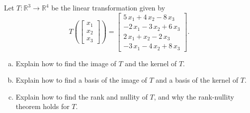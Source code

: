 
\begin{exerciseStatement}
 Let \(T:\mathbb{R}^ 3  \to \mathbb{R}^ 4 \) be the linear transformation given by \[T\left(  \left[\begin{array}{c}
x_{1} \\
x_{2} \\
x_{3}
\end{array}\right]  \right) =  \left[\begin{array}{c}
5 \, x_{1} + 4 \, x_{2} - 8 \, x_{3} \\
-2 \, x_{1} - 3 \, x_{2} + 6 \, x_{3} \\
2 \, x_{1} + x_{2} - 2 \, x_{3} \\
-3 \, x_{1} - 4 \, x_{2} + 8 \, x_{3}
\end{array}\right] .\]
\begin{enumerate}[(a)]
\item Explain how to find the image of \(T\) and the kernel of \(T\).
\item Explain how to find a basis of the image of \(T\) and a basis of the kernel of \(T\).
\item Explain how to find the rank and nullity of \(T\), and why the rank-nullity theorem holds for \(T\).
\end{enumerate}
    
\end{exerciseStatement}
    
